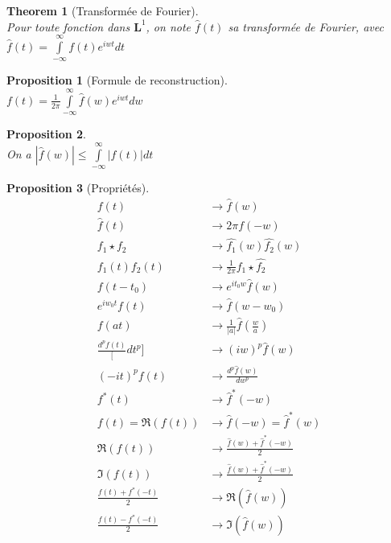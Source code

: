 \documentclass[a4paper]{article}
\newtheorem*{prop}{Proposition}
\newtheorem*{theorem}{Theorem}
\renewcommand{\leq}{\leqslant}
\renewcommand{\(}{\left(}
\renewcommand{\)}{\right)}
\begin{document}
\begin{theorem}[Transformée de Fourier]~\\
  Pour toute fonction dans $\mathbf{L}^1$, on note $\hat{f}(t)$ sa transformée
  de Fourier, avec $\hat{f}(t) = \int\limits_{-\infty}^{\infty} f(t)e^{iwt}dt$
\end{theorem}

\begin{prop}[Formule de reconstruction]~\\
  $f(t) = \frac{1}{2\pi}\int\limits_{-\infty}^{\infty} \hat{f}(w)e^{iwt}dw$
\end{prop}

\begin{prop}~\\
  On a $|\hat{f}(w)| \leq \int\limits_{-\infty}^\infty |f(t)|dt$
\end{prop}

\begin{prop}[Propriétés]~\\
  \begin{align*}
    f(t) &\rightarrow \hat{f}(w)\\
    \hat{f}(t) &\rightarrow 2\pi f(-w)\\
    f_1 \star f_2 &\rightarrow \hat{f_1}(w) \hat{f_2}(w)\\
    f_1(t)f_2(t) &\rightarrow \frac{1}{2\pi} \hat{f_1}\star \hat{f_2}\\
    f(t-t_0) &\rightarrow e^{it_0w}\hat{f}(w)\\
    e^{iw_0t}f(t) &\rightarrow \hat{f}(w-w_0)\\
    f(at) &\rightarrow \frac{1}{|a|}\hat{f}(\frac{w}{a})\\
    \frac{d^pf(t)}[dt^p] &\rightarrow (iw)^p\hat{f}(w)\\
    (-it)^pf(t) &\rightarrow \frac{d^p\hat{f}(w)}{dw^p}\\
    f^*(t) &\rightarrow \hat{f}^*(-w)\\
    f(t) = \Re(f(t)) &\rightarrow \hat{f}(-w) = \hat{f}^*(w)\\
    \Re(f(t)) &\rightarrow \frac{\hat{f}(w) + \hat{f}^*(-w)}{2}\\
    \Im(f(t)) &\rightarrow \frac{\hat{f}(w) + \hat{f}^*(-w)}{2}\\
    \frac{f(t)+f^*(-t)}{2} &\rightarrow \Re(\hat{f}(w))\\
    \frac{f(t)-f^*(-t)}{2} &\rightarrow \Im(\hat{f}(w))
  \end{align*}
\end{prop}
\end{document}
